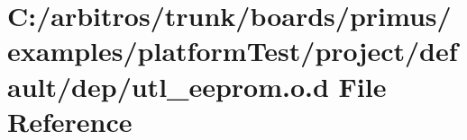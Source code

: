 \hypertarget{platform_test_2project_2default_2dep_2utl__eeprom_8o_8d}{\section{C\-:/arbitros/trunk/boards/primus/examples/platform\-Test/project/default/dep/utl\-\_\-eeprom.o.\-d File Reference}
\label{platform_test_2project_2default_2dep_2utl__eeprom_8o_8d}
}
